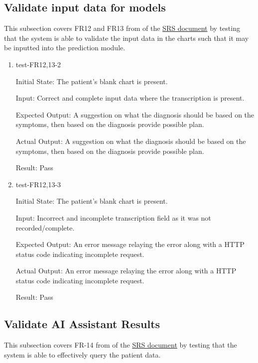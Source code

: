 \documentclass[12pt, titlepage]{article}
\begin{document}
\subsection{Validate input data for models} \label{section:3.7}

This subsection covers FR12 and FR13 from of the \href{https://github.com/Inreet-Kaur/capstone/blob/main/docs/SRS/SRS.pdf} {SRS document} by testing that the system is able to validate the input data in the charts such that it may be inputted into the prediction module.

\begin{enumerate}

  \item{test-FR12,13-2} \label{test-FR12,13-2}
  
  Initial State: The patient's blank chart is present.

  Input: Correct and complete input data where the transcription is present.

  Expected Output: A suggestion on what the diagnosis should be based on the symptoms, then based on the diagnosis provide possible plan.

  Actual Output: A suggestion on what the diagnosis should be based on the symptoms, then based on the diagnosis provide possible plan.

  Result: Pass

  \item{test-FR12,13-3} \label{test-FR12,13-3}
  
  Initial State: The patient's blank chart is present.

  Input: Incorrect and incomplete transcription field as it was not recorded/complete.

  Expected Output: An error message relaying the error along with a HTTP status code indicating incomplete request.

  Actual Output: An error message relaying the error along with a HTTP status code indicating incomplete request.

  Result: Pass

\end{enumerate}

\subsection{Validate AI Assistant Results} \label{section:3.8}
This subsection covers FR-14 from of the \href{https://github.com/Inreet-Kaur/capstone/blob/main/docs/SRS/SRS.pdf} {SRS document} by testing that the system is able to effectively query the patient data.
\end{document}
